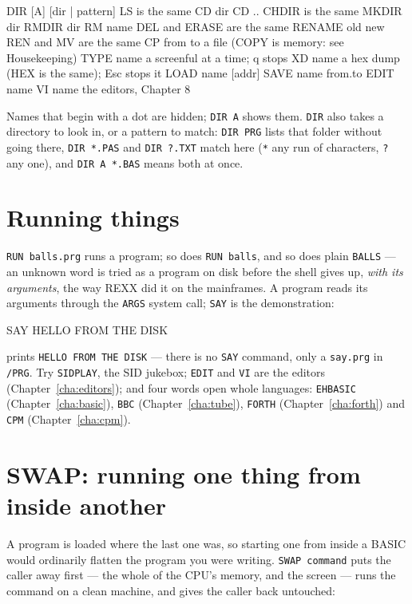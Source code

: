 \begin{type}
DIR [A] [dir | pattern]     LS is the same
CD dir       CD ..          CHDIR is the same
MKDIR dir    RMDIR dir
RM name                     DEL and ERASE are the same
RENAME old new              REN and MV are the same
CP from to                  a file (COPY is memory: see Housekeeping)
TYPE name                   a screenful at a time; q stops
XD name                     a hex dump (HEX is the same); Esc stops it
LOAD name [addr]            SAVE name from.to
EDIT name    VI name        the editors, Chapter 8
\end{type}

Names that begin with a dot are hidden; \verb|DIR A| shows them.
\verb|DIR| also takes a directory to look in, or a pattern to match:
\verb|DIR PRG| lists that folder without going there, \verb|DIR *.PAS| and
\verb|DIR ?.TXT| match here (\verb|*| any run of characters, \verb|?| any
one), and \verb|DIR A *.BAS| means both at once.


\section{Running things}
\verb|RUN balls.prg| runs a program; so does \verb|RUN balls|, and so does
plain \verb|BALLS| --- an unknown word is tried as a program on disk before
the shell gives up, \emph{with its arguments}, the way REXX did it on the
mainframes. A program reads its arguments through the \texttt{ARGS} system
call; \verb|SAY| is the demonstration:

\begin{type}
SAY HELLO FROM THE DISK
\end{type}

prints \texttt{HELLO FROM THE DISK} --- there is no \texttt{SAY} command,
only a \texttt{say.prg} in \texttt{/PRG}. Try \verb|SIDPLAY|, the SID
jukebox; \verb|EDIT| and \verb|VI| are the editors
(Chapter~\ref{cha:editors}); and four words open whole languages:
\verb|EHBASIC| (Chapter~\ref{cha:basic}), \verb|BBC|
(Chapter~\ref{cha:tube}), \verb|FORTH| (Chapter~\ref{cha:forth}) and
\verb|CPM| (Chapter~\ref{cha:cpm}).

\section{SWAP: running one thing from inside another}
A program is loaded where the last one was, so starting one from inside a
BASIC would ordinarily flatten the program you were writing.
\verb|SWAP command| puts the caller away first --- the whole of the CPU's
memory, and the screen --- runs the command on a clean machine, and gives
the caller back untouched:

